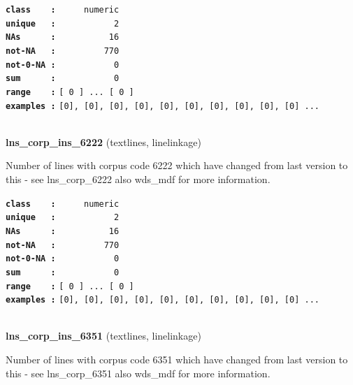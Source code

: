 \documentclass[]{article}
\begin{document}
\textbf{\texttt{class\ \ \ \ :}} \texttt{~~~~~numeric}\\
\textbf{\texttt{unique\ \ \ :}} \texttt{~~~~~~~~~~~2}\\
\textbf{\texttt{NAs\ \ \ \ \ \ :}} \texttt{~~~~~~~~~~16}\\
\textbf{\texttt{not-NA\ \ \ :}} \texttt{~~~~~~~~~770}\\
\textbf{\texttt{not-0-NA\ :}} \texttt{~~~~~~~~~~~0}\\
\textbf{\texttt{sum\ \ \ \ \ \ :}} \texttt{~~~~~~~~~~~0}\\
\textbf{\texttt{range\ \ \ \ :}}
\texttt{{[}\ 0\ {]}\ ...\ {[}\ 0\ {]}}\\
\textbf{\texttt{examples\ :}}
\texttt{{[}0{]},\ {[}0{]},\ {[}0{]},\ {[}0{]},\ {[}0{]},\ {[}0{]},\ {[}0{]},\ {[}0{]},\ {[}0{]},\ {[}0{]}\ ...}\\

~

\textbf{lns\_corp\_ins\_6222} (textlines, linelinkage)

Number of lines with corpus code 6222 which have changed from last
version to this - see lns\_corp\_6222 also wds\_mdf for more
information.

\textbf{\texttt{class\ \ \ \ :}} \texttt{~~~~~numeric}\\
\textbf{\texttt{unique\ \ \ :}} \texttt{~~~~~~~~~~~2}\\
\textbf{\texttt{NAs\ \ \ \ \ \ :}} \texttt{~~~~~~~~~~16}\\
\textbf{\texttt{not-NA\ \ \ :}} \texttt{~~~~~~~~~770}\\
\textbf{\texttt{not-0-NA\ :}} \texttt{~~~~~~~~~~~0}\\
\textbf{\texttt{sum\ \ \ \ \ \ :}} \texttt{~~~~~~~~~~~0}\\
\textbf{\texttt{range\ \ \ \ :}}
\texttt{{[}\ 0\ {]}\ ...\ {[}\ 0\ {]}}\\
\textbf{\texttt{examples\ :}}
\texttt{{[}0{]},\ {[}0{]},\ {[}0{]},\ {[}0{]},\ {[}0{]},\ {[}0{]},\ {[}0{]},\ {[}0{]},\ {[}0{]},\ {[}0{]}\ ...}\\

~

\textbf{lns\_corp\_ins\_6351} (textlines, linelinkage)

Number of lines with corpus code 6351 which have changed from last
version to this - see lns\_corp\_6351 also wds\_mdf for more
information.
\end{document}
